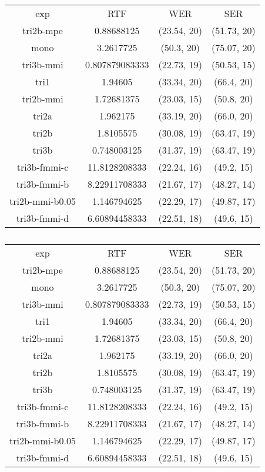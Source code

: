 \begin{table}[!htp]\centering\begin{tabular}{cccc}
exp             & \ac{RTF}       & \ac{WER}         & \ac{SER} \\
tri2b-mpe       & 0.88688125     & (23.54, 20) & (51.73, 20)\\
mono            & 3.2617725      & (50.3, 20)  & (75.07, 20)\\
tri3b-mmi       & 0.807879083333 & (22.73, 19) & (50.53, 15)\\
tri1            & 1.94605        & (33.34, 20) & (66.4, 20) \\
tri2b-mmi       & 1.72681375     & (23.03, 15) & (50.8, 20) \\
tri2a           & 1.962175       & (33.19, 20) & (66.0, 20) \\
tri2b           & 1.8105575      & (30.08, 19) & (63.47, 19)\\
tri3b           & 0.748003125    & (31.37, 19) & (63.47, 19)\\
tri3b-fmmi-c    & 11.8128208333  & (22.24, 16) & (49.2, 15) \\
tri3b-fmmi-b    & 8.22911708333  & (21.67, 17) & (48.27, 14)\\
tri2b-mmi-b0.05 & 1.146794625    & (22.29, 17) & (49.87, 17)\\
tri3b-fmmi-d    & 6.60894458333  & (22.51, 18) & (49.6, 15)
\end{tabular}
\caption{}
\end{table}  

\begin{table}[!htp]\centering\begin{tabular}{cccc}
exp             & \ac{RTF}       & \ac{WER}         & \ac{SER} \\
tri2b-mpe       & 0.88688125     & (23.54, 20) & (51.73, 20)\\
mono            & 3.2617725      & (50.3, 20)  & (75.07, 20)\\
tri3b-mmi       & 0.807879083333 & (22.73, 19) & (50.53, 15)\\
tri1            & 1.94605        & (33.34, 20) & (66.4, 20) \\
tri2b-mmi       & 1.72681375     & (23.03, 15) & (50.8, 20) \\
tri2a           & 1.962175       & (33.19, 20) & (66.0, 20) \\
tri2b           & 1.8105575      & (30.08, 19) & (63.47, 19)\\
tri3b           & 0.748003125    & (31.37, 19) & (63.47, 19)\\
tri3b-fmmi-c    & 11.8128208333  & (22.24, 16) & (49.2, 15) \\
tri3b-fmmi-b    & 8.22911708333  & (21.67, 17) & (48.27, 14)\\
tri2b-mmi-b0.05 & 1.146794625    & (22.29, 17) & (49.87, 17)\\
tri3b-fmmi-d    & 6.60894458333  & (22.51, 18) & (49.6, 15)
\end{tabular}
\caption{}
\end{table}  

